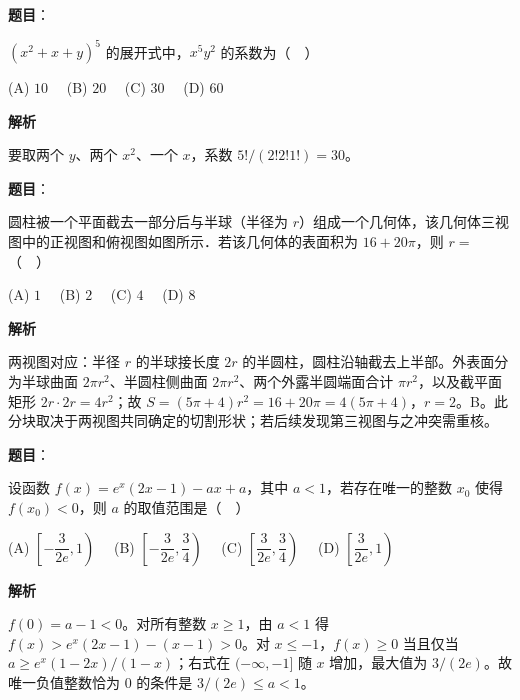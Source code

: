 \begin{answer}

\textbf{题目}：

$(x^2+x+y)^5$ 的展开式中，$x^5y^2$ 的系数为（　）

(A) $10$　 (B) $20$　 (C) $30$　 (D) $60$

\textbf{解析}

要取两个 $y$、两个 $x^2$、一个 $x$，系数 $5!/(2!2!1!)=30$。


\end{answer}
\begin{answer}

\textbf{题目}：

圆柱被一个平面截去一部分后与半球（半径为 $r$）组成一个几何体，该几何体三视图中的正视图和俯视图如图所示．若该几何体的表面积为 $16+20\pi$，则 $r=$（　）
\nopagebreak[4]
\begin{center}\end{center}
\nopagebreak[4]
\nopagebreak[4]
\begin{center}\end{center}
\nopagebreak[4]
(A) $1$　 (B) $2$　 (C) $4$　 (D) $8$

\textbf{解析}

两视图对应：半径 $r$ 的半球接长度 $2r$ 的半圆柱，圆柱沿轴截去上半部。外表面分为半球曲面 $2\pi r^2$、半圆柱侧曲面 $2\pi r^2$、两个外露半圆端面合计 $\pi r^2$，以及截平面矩形 $2r\cdot2r=4r^2$；故 $S=(5\pi+4)r^2=16+20\pi=4(5\pi+4)$，$r=2$。B。此分块取决于两视图共同确定的切割形状；若后续发现第三视图与之冲突需重核。


\end{answer}
\begin{answer}

\textbf{题目}：

设函数 $f(x)=e^x(2x-1)-ax+a$，其中 $a<1$，若存在唯一的整数 $x_0$ 使得 $f(x_0)<0$，则 $a$ 的取值范围是（　）

(A) $\left[-\dfrac{3}{2e},1\right)$　 (B) $\left[-\dfrac{3}{2e},\dfrac34\right)$　 (C) $\left[\dfrac{3}{2e},\dfrac34\right)$　 (D) $\left[\dfrac{3}{2e},1\right)$

\textbf{解析}

$f(0)=a-1<0$。对所有整数 $x\geqslant1$，由 $a<1$ 得 $f(x)>e^x(2x-1)-(x-1)>0$。对 $x\leqslant-1$，$f(x)\geqslant0$ 当且仅当 $a\geqslant e^x(1-2x)/(1-x)$；右式在 $(-\infty,-1]$ 随 $x$ 增加，最大值为 $3/(2e)$。故唯一负值整数恰为 $0$ 的条件是 $3/(2e)\leqslant a<1$。

\gkanswer{答案：D，$[\frac{3}{2e},1)$}

\end{answer}
